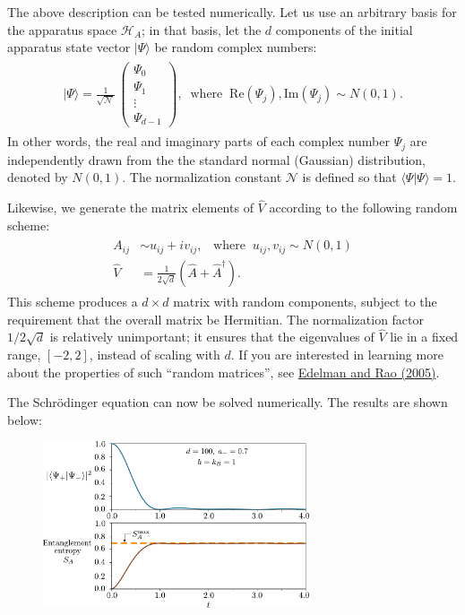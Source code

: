 \documentclass[pra,12pt]{revtex4}
\begin{document}
The above description can be tested numerically.  Let us use an
arbitrary basis for the apparatus space $\mathscr{H}_A$; in that
basis, let the $d$ components of the initial apparatus state vector
$|\Psi\rangle$ be random complex numbers:
\begin{align}
  \begin{aligned}
  |\Psi\rangle = \frac{1}{\sqrt{\mathcal{N}}}\, \begin{pmatrix}\Psi_0 \\ \Psi_1 \\ \vdots \\ \Psi_{d-1}
  \end{pmatrix}, \;\; \mathrm{where} \;\; \mathrm{Re}(\Psi_j), \mathrm{Im}(\Psi_j) \sim N(0,1).
  \end{aligned}
\end{align}
In other words, the real and imaginary parts of each complex number
$\Psi_j$ are independently drawn from the the standard normal
(Gaussian) distribution, denoted by $N(0,1)$.  The normalization
constant $\mathcal{N}$ is defined so that $\langle\Psi|\Psi\rangle =
1$.

Likewise, we generate the matrix elements of $\hat{V}$ according to
the following random scheme:
\begin{align}
  \begin{aligned}A_{ij} &\sim u_{ij} + i v_{ij}, \;\;\;\mathrm{where}\;\;u_{ij},v_{ij}\sim N(0,1)\\ \hat{V} &= \frac{1}{2\sqrt{d}} \left(\hat{A} + \hat{A}^\dagger\right).\end{aligned}
\end{align}
This scheme produces a $d\times d$ matrix with random components,
subject to the requirement that the overall matrix be Hermitian.  The
normalization factor $1/2\sqrt{d}$ is relatively unimportant; it
ensures that the eigenvalues of $\hat{V}$ lie in a fixed range,
$[-2,2]$, instead of scaling with $d$.  If you are interested in
learning more about the properties of such ``random matrices'', see
\hyperref[cite:edelman]{Edelman and Rao (2005)}.

The Schr\"odinger equation can now be solved numerically.  The results
are shown below:

\begin{figure}[h]
  \centering\includegraphics[width=0.7\textwidth]{decoherence}
\end{figure}
\end{document}
